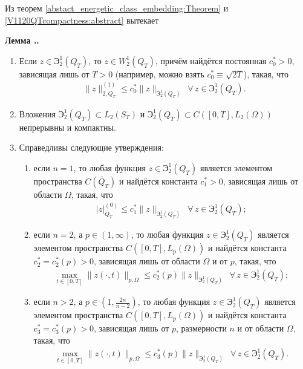 \documentclass{report}
\newcounter{rem}[section]
\renewcommand{\theenumi}{\arabic{enumi}}
\renewcommand{\labelenumi}{\theenumi)}
\newcounter{lem}[section]
\renewcommand{\thelem}{\thesection.\arabic{lem}}
\newenvironment{Lemma}{\par\refstepcounter{lem}\bf Лемма \thelem. \it}{\rm\par}
\begin{document}
Из теорем \ref{abstact_energetic_class_embedding:Theorem} и \ref{V1120QTcompactness:abstract} вытекает
\begin{Lemma}\label{En1_2Q_T::embedding}
\renewcommand{\labelenumi}{\arabic{enumi})}
\renewcommand{\labelenumii}{\asbuk{enumii})}
\begin{enumerate}
    \item
Если $z\in \textrm{Э}^{1}_{2}(Q_T)$, то $z\in W^{1}_{2}(Q_T)$, причём найдётся постоянная $c_0^*>0$, зависящая лишь от $T>0$ (например, можно взять $c_0^*\equiv\sqrt{2T}$), такая, что
\begin{gather*}
\|z\|^{(1)}_{2,Q_T}\leqslant c_0^*\|z\|_{\textrm{Э}^{1}_{2}(Q_T)}\,\,\,\forall\,z\in \textrm{Э}^{1}_{2}(Q_T).
\end{gather*}
    \item
Вложения $\textrm{Э}^{1}_{2}(Q_T)\subset L_2(S_T)$ и $\textrm{Э}^{1}_{2}(Q_T)\subset C([0,T],L_2(\Omega))$ непрерывны и компактны.
    \item
Справедливы следующие утверждения:
\begin{enumerate}
    \item если $n=1$, то любая функция $z\in \textrm{Э}^{1}_{2}(Q_T)$ является элементом пространства $C(\bar Q_T)$ и найдётся константа $c^*_1>0$, зависящая лишь от области $\Omega$,
такая, что
\begin{gather*}
\pmb{|}z\pmb{|}^{(0)}_{\bar Q_T}\leqslant c^*_1\|z\|_{\textrm{Э}^{1}_{2}(Q_T)}\,\,\,\forall\,z\in \textrm{Э}^{1}_{2}(Q_T);
\end{gather*}

    \item
 если $n=2$, а $p\in(1,\infty)$, то любая функция $z\in \textrm{Э}^{1}_{2}(Q_T)$ является элементом пространства $C([0,T],L_p(\Omega))$ и найдётся
константа $c^*_2=c_2^*(p)>0$, зависящая лишь от области $\Omega$ и от $p$, такая, что
\begin{gather*}
\max\limits_{t\in[0,T]}\|z(\cdot,t)\|_{p,\Omega}\leqslant c^*_2(p)\|z\|_{\textrm{Э}^{1}_{2}(Q_T)}\,\,\,\forall\,z\in \textrm{Э}^{1}_{2}(Q_T);
\end{gather*}

    \item
если $n>2$, а $p\in(1,\frac{2n}{n-2})$, то любая функция $z\in \textrm{Э}^{1}_{2}(Q_T)$ является элементом пространства $C([0,T],L_p(\Omega))$ и
найдётся константа $c^*_3=c_3^*(p)>0$, зависящая лишь от $p$, размерности $n$ и от области $\Omega$, такая, что
\begin{gather*}
\max\limits_{t\in[0,T]}\|z(\cdot,t)\|_{p,\Omega}\leqslant c^*_3(p)\|z\|_{\textrm{Э}^{1}_{2}(Q_T)}\,\,\,\forall\,z\in \textrm{Э}^{1}_{2}(Q_T).
\end{gather*}
\end{enumerate}


\end{enumerate}
\end{Lemma}
\end{document}
